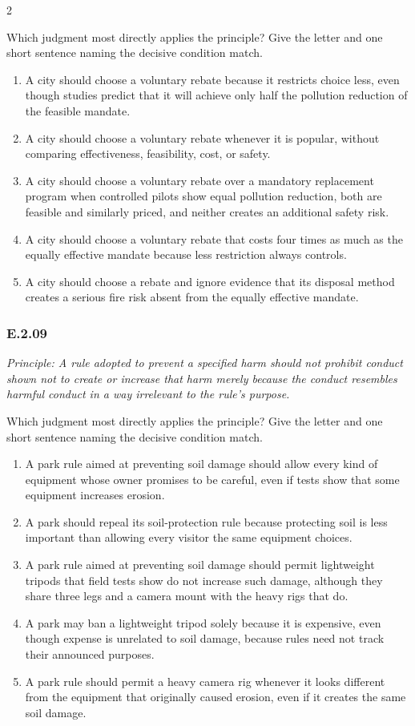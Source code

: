 \documentclass[10pt]{extarticle}
\newcommand{\choice}[1]{\item #1}
\newcommand{\bankitem}[1]{\subsubsection*{#1}}
\begin{document}
\begin{multicols}{2}
\begin{samepage}
Which judgment most directly applies the principle? Give the letter and one short sentence naming the decisive condition match.
\begin{enumerate}[label=(\alph*)]
  \choice{A city should choose a voluntary rebate because it restricts choice less, even though studies predict that it will achieve only half the pollution reduction of the feasible mandate.}
  \choice{A city should choose a voluntary rebate whenever it is popular, without comparing effectiveness, feasibility, cost, or safety.}
  \choice{A city should choose a voluntary rebate over a mandatory replacement program when controlled pilots show equal pollution reduction, both are feasible and similarly priced, and neither creates an additional safety risk.}
  \choice{A city should choose a voluntary rebate that costs four times as much as the equally effective mandate because less restriction always controls.}
  \choice{A city should choose a rebate and ignore evidence that its disposal method creates a serious fire risk absent from the equally effective mandate.}
\end{enumerate}
\end{samepage}\par\smallskip
\begin{samepage}
\bankitem{E.2.09}
\emph{Principle: A rule adopted to prevent a specified harm should not prohibit conduct shown not to create or increase that harm merely because the conduct resembles harmful conduct in a way irrelevant to the rule's purpose.}

Which judgment most directly applies the principle? Give the letter and one short sentence naming the decisive condition match.
\begin{enumerate}[label=(\alph*)]
  \choice{A park rule aimed at preventing soil damage should allow every kind of equipment whose owner promises to be careful, even if tests show that some equipment increases erosion.}
  \choice{A park should repeal its soil-protection rule because protecting soil is less important than allowing every visitor the same equipment choices.}
  \choice{A park rule aimed at preventing soil damage should permit lightweight tripods that field tests show do not increase such damage, although they share three legs and a camera mount with the heavy rigs that do.}
  \choice{A park may ban a lightweight tripod solely because it is expensive, even though expense is unrelated to soil damage, because rules need not track their announced purposes.}
  \choice{A park rule should permit a heavy camera rig whenever it looks different from the equipment that originally caused erosion, even if it creates the same soil damage.}
\end{enumerate}
\end{samepage}\par\smallskip

\end{multicols}
\end{document}
